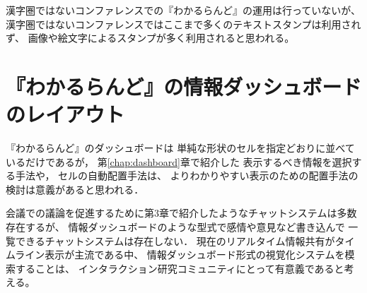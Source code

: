 漢字圏ではないコンファレンスでの『わかるらんど』の運用は行っていないが、
漢字圏ではないコンファレンスではここまで多くのテキストスタンプは利用されず、
画像や絵文字によるスタンプが多く利用されると思われる。


\section{『わかるらんど』の情報ダッシュボードのレイアウト}

『わかるらんど』のダッシュボードは
単純な形状のセルを指定どおりに並べているだけであるが，
第\ref{chap:dashboard}章で紹介した
表示するべき情報を選択する手法\cite{Jones:2015:ECI:2800835.2800963}や，
セルの自動配置手法\cite{Hertzog:2015:BSP:2678025.2701383}は、
よりわかりやすい表示のための配置手法の検討は意義があると思われる．

会議での議論を促進するために第3章で紹介したようなチャットシステムは多数存在するが、
情報ダッシュボードのような型式で感情や意見など書き込んで
一覧できるチャットシステムは存在しない．
現在のリアルタイム情報共有がタイムライン表示が主流である中、
情報ダッシュボード形式の視覚化システムを模索することは、
インタラクション研究コミュニティにとって有意義であると考える。